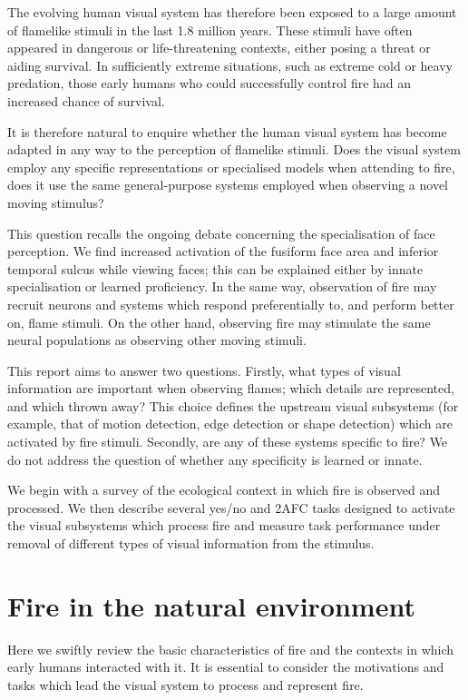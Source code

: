 \documentclass{jov}
\begin{document}
The evolving human visual system has therefore been exposed to a large amount of flamelike stimuli in the last 1.8 million years. These stimuli have often appeared in dangerous or life-threatening contexts, either posing a threat or aiding survival. In sufficiently extreme situations, such as extreme cold or heavy predation, those early humans who could successfully control fire had an increased chance of survival.

It is therefore natural to enquire whether the human visual system has become adapted in any way to the perception of flamelike stimuli. Does the visual system employ any specific representations or specialised models when attending to fire, does it use the same general-purpose systems employed when observing a novel moving stimulus?

This question recalls the ongoing debate concerning the specialisation of face perception. We find increased activation of the fusiform face area and inferior temporal sulcus while viewing faces; this can be explained either by innate specialisation or learned proficiency. In the same way, observation of fire may recruit neurons and systems which respond preferentially to, and perform better on, flame stimuli. On the other hand, observing fire may stimulate the same neural populations as observing other moving stimuli.

This report aims to answer two questions. Firstly, what types of visual information are important when observing flames; which details are represented, and which thrown away? This choice defines the upstream visual subsystems (for example, that of motion detection, edge detection or shape detection) which are activated by fire stimuli. Secondly, are any of these systems specific to fire? We do not address the question of whether any specificity is learned or innate.

We begin with a survey of the ecological context in which fire is observed and processed. We then describe several yes/no and 2AFC tasks designed to activate the visual subsystems which process fire and measure task performance under removal of different types of visual information from the stimulus.

\section{Fire in the natural environment}

Here we swiftly review the basic characteristics of fire and the contexts in which early humans interacted with it. It is essential to consider the motivations and tasks which lead the visual system to process and represent fire.
\end{document}
